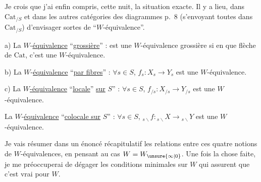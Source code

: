 
Je crois que j'ai enfin compris, cette nuit, la situation exacte. Il y a lieu, dans $\mathrm{Cat}_{/S}$ et dans les autres catégories des diagrammes p.~8 (s'envoyant toutes dans $\mathrm{Cat}_{/S}$)\unsure{,} d'envisager   sortes de ``$W$-équivalence''.

a) La $W$-\uline{équivalence} ``\uline{grossière}'' :
 est une $W$-équivalence grossière si en  que flèche de $\mathrm{Cat}$, c'est une $W$-équivalence.

b) La $W$-\uline{équivalence} ``\uline{par fibres}'' : $\forall s\in S$, $f_s:X_s\longrightarrow Y_s$ est une $W$-équivalence. 

c) La \uline{$W$-équivalence} ``\uline{locale}'' \uline{sur} $S$'' : $\forall s\in S$, $f_{/s}:X_{/s}\longrightarrow Y_{/s}$ est une $W$-équivalence. 

 La $W$-\uline{équivalence} ``\uline{colocale sur} $S$'' : $\forall s\in S$, $ {}_{s\backslash}f:{}_{s\backslash}X\longrightarrow{}_{s\backslash}Y$ est une $W$-équivalence. 

Je vais résumer dans un énoncé récapitulatif les relations entre ces quatre notions de $W$-équivalences, en pensant au cas $W=W_{\unsure{\infty|0}}$. Une fois la chose faite, je me préoccuperai de dégager les conditions minimales sur  $W$  qui assurent que c'est vrai pour $W$.

